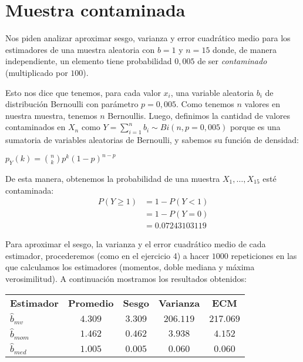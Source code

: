\section{Muestra contaminada}
Nos piden analizar aproximar sesgo, varianza y error cuadrático medio para los estimadores de una muestra aleatoria con $b = 1$ y $n = 15$ donde, de manera independiente, un elemento tiene probabilidad $0,005$ de ser \textit{contaminado} (multiplicado por $100$).

\vskip 8pt

Esto nos dice que tenemos, para cada valor $x_{i}$, una variable aleatoria $b_{i}$ de distribución Bernoulli con parámetro $p = 0,005$. Como tenemos $n$ valores en nuestra muestra, tenemos $n$ Bernoullis. Luego, definimos la cantidad de valores contaminados en $X_{n}$ como $Y = \sum_{i=1}^{n}b_{i} \sim Bi(n, p = 0,005)$ porque es una sumatoria de variables aleatorias de Bernoulli, y sabemos su función de densidad:

\begin{center}
	$p_Y(k) = \binom{n}{k}p^k(1-p)^{n-p}$
\end{center}

De esta manera, obtenemos la probabilidad de una muestra $X_1, \dots, X_{15}$ esté contaminada:
\begin{align*}
	P(Y \geq 1) &= 1 - P(Y < 1) \\
				&= 1 - P(Y = 0) \\
				&= 0.07243103119
\end{align*}

Para aproximar el sesgo, la varianza y el error cuadrático medio de cada estimador, procederemos (como en el ejercicio 4) a hacer $1000$ repeticiones en las que calculamos los estimadores (momentos, doble mediana y máxima verosimilitud). A continuación mostramos los resultados obtenidos:

\begin{table}[H]
	\centering
	\begin{tabular}{lcccc}
		\textbf{Estimador} 	& \textbf{Promedio} & \textbf{Sesgo} & \textbf{Varianza} & \textbf{ECM} \\
		$\hat{b}_{mv}$		& $4.309$			& $3.309$		 & $206.119$		 & $217.069$	\\
		$\hat{b}_{mom}$ 	& $1.462$ 			& $0.462$ 		 & $3.938$ 			 & $4.152$		\\
		$\hat{b}_{med}$ 	& $1.005$ 			& $0.005$ 		 & $0.060$ 			 & $0.060$
	\end{tabular}
\end{table}

